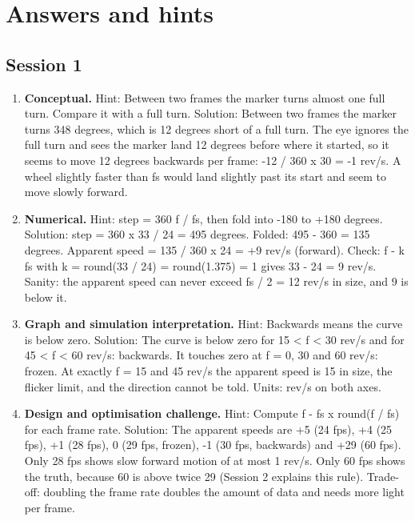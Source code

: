 \documentclass[11pt,a4paper]{article}
\begin{document}
\section{Answers and hints}

\subsection*{Session 1}
\begin{enumerate}[nosep]
\item \textbf{Conceptual.} Hint: Between two frames the marker turns almost one full turn. Compare it with a full turn. Solution: Between two frames the marker turns 348 degrees, which is 12 degrees short of a full turn. The eye ignores the full turn and sees the marker land 12 degrees before where it started, so it seems to move 12 degrees backwards per frame: -12 / 360 x 30 = -1 rev/s. A wheel slightly faster than fs would land slightly past its start and seem to move slowly forward.
\item \textbf{Numerical.} Hint: step = 360 f / fs, then fold into -180 to +180 degrees. Solution: step = 360 x 33 / 24 = 495 degrees. Folded: 495 - 360 = 135 degrees. Apparent speed = 135 / 360 x 24 = +9 rev/s (forward). Check: f - k fs with k = round(33 / 24) = round(1.375) = 1 gives 33 - 24 = 9 rev/s. Sanity: the apparent speed can never exceed fs / 2 = 12 rev/s in size, and 9 is below it.
\item \textbf{Graph and simulation interpretation.} Hint: Backwards means the curve is below zero. Solution: The curve is below zero for 15 \textless{} f \textless{} 30 rev/s and for 45 \textless{} f \textless{} 60 rev/s: backwards. It touches zero at f = 0, 30 and 60 rev/s: frozen. At exactly f = 15 and 45 rev/s the apparent speed is 15 in size, the flicker limit, and the direction cannot be told. Units: rev/s on both axes.
\item \textbf{Design and optimisation challenge.} Hint: Compute f - fs x round(f / fs) for each frame rate. Solution: The apparent speeds are +5 (24 fps), +4 (25 fps), +1 (28 fps), 0 (29 fps, frozen), -1 (30 fps, backwards) and +29 (60 fps). Only 28 fps shows slow forward motion of at most 1 rev/s. Only 60 fps shows the truth, because 60 is above twice 29 (Session 2 explains this rule). Trade-off: doubling the frame rate doubles the amount of data and needs more light per frame.
\end{enumerate}
\end{document}

